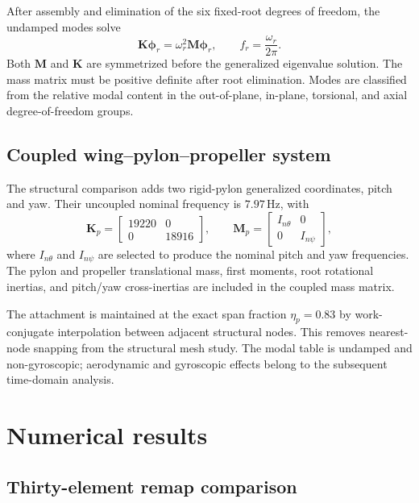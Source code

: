 \documentclass[11pt,a4paper]{article}
\newcommand{\mat}[1]{\bm{#1}}
\newcommand{\vect}[1]{\bm{#1}}
\newcommand{\Hz}{\,\mathrm{Hz}}
\begin{document}
After assembly and elimination of the six fixed-root degrees of freedom, the
undamped modes solve
\begin{equation}
\mat K\vect\phi_r = \omega_r^2\mat M\vect\phi_r,
\qquad
f_r=\frac{\omega_r}{2\pi}.
\end{equation}
Both \(\mat M\) and \(\mat K\) are symmetrized before the generalized
eigenvalue solution.  The mass matrix must be positive definite after root
elimination.  Modes are classified from the relative modal content in the
out-of-plane, in-plane, torsional, and axial degree-of-freedom groups.

\subsection{Coupled wing--pylon--propeller system}

The structural comparison adds two rigid-pylon generalized coordinates,
pitch and yaw.  Their uncoupled nominal frequency is \(7.97\Hz\), with
\begin{equation}
\mat K_p =
\begin{bmatrix}
19220 & 0\\ 0 & 18916
\end{bmatrix},
\qquad
\mat M_p =
\begin{bmatrix}
I_{n\theta} & 0\\ 0 & I_{n\psi}
\end{bmatrix},
\end{equation}
where \(I_{n\theta}\) and \(I_{n\psi}\) are selected to produce the nominal
pitch and yaw frequencies.  The pylon and propeller translational mass,
first moments, root rotational inertias, and pitch/yaw cross-inertias are
included in the coupled mass matrix.

The attachment is maintained at the exact span fraction
\(\eta_p=0.83\) by work-conjugate interpolation between adjacent structural
nodes.  This removes nearest-node snapping from the structural mesh study.
The modal table is undamped and non-gyroscopic; aerodynamic and gyroscopic
effects belong to the subsequent time-domain analysis.

\section{Numerical results}

\subsection{Thirty-element remap comparison}
\end{document}
